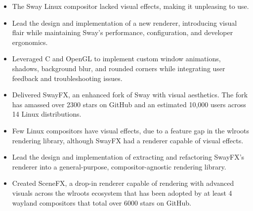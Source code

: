 


\begin{itemize}
    \item The Sway Linux compositor lacked visual effects, making it unpleasing to use.
    \item Lead the design and implementation of a new renderer, introducing visual flair while maintaining Sway’s performance, configuration, and developer ergonomics.
    \item Leveraged C and OpenGL to implement custom window animations, shadows, background blur, and rounded corners while integrating user feedback and troubleshooting issues.
    \item Delivered SwayFX, an enhanced fork of Sway with visual aesthetics. The fork has amassed over 2300 stars on GitHub and an estimated 10,000 users across 14 Linux distributions.
\end{itemize}

\divider

\begin{itemize}
    \item Few Linux compositors have visual effects, due to a feature gap in the wlroots rendering library, although SwayFX had a renderer capable of visual effects.
    \item Lead the design and implementation of extracting and refactoring SwayFX’s renderer into a general-purpose, compositor-agnostic rendering library.
    \item Created SceneFX, a drop-in renderer capable of rendering with advanced visuals across the wlroots ecosystem that has been adopted by at least 4 wayland compositors that total over 6000 stars on GitHub.
\end{itemize}



